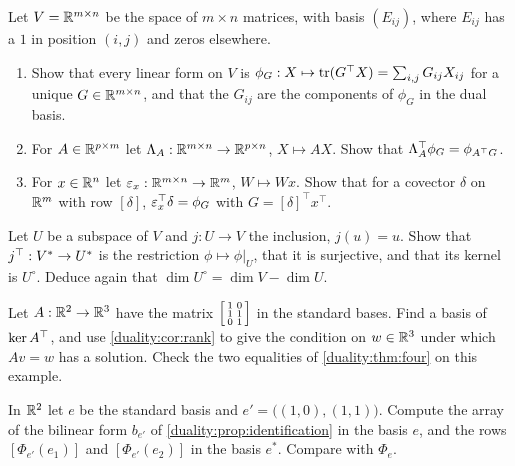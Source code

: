 \begin{notechapter}
\begin{exercise}\label{duality:exr:4}
Let $V = \mathbb{R}^{m\times n}$ be the space of $m\times n$ matrices, with basis
$(E_{ij})$, where $E_{ij}$ has a $1$ in position $(i, j)$ and zeros
elsewhere.
\begin{enumerate}[nosep]
  \item Show that every linear form on $V$ is
        $\phi_G:X\mapsto\operatorname{tr}(G^\top X) = \sum_{i,j}G_{ij}X_{ij}$ for a
        unique $G\in\mathbb{R}^{m\times n}$, and that the $G_{ij}$ are the
        components of $\phi_G$ in the dual basis.
  \item For $A\in\mathbb{R}^{p\times m}$ let $\Lambda_A:\mathbb{R}^{m\times n}\to
        \mathbb{R}^{p\times n}$, $X\mapsto AX$. Show that
        $\Lambda_A^{\top}\phi_G = \phi_{A^\top G}$.
  \item For $x\in\mathbb{R}^n$ let $\varepsilon_x:\mathbb{R}^{m\times n}\to\mathbb{R}^m$,
        $W\mapsto Wx$. Show that for a covector $\delta$ on $\mathbb{R}^m$ with
        row $[\delta]$, $\varepsilon_x^{\top}\delta = \phi_G$ with
        $G = [\delta]^\top x^\top$.
\end{enumerate}
\end{exercise}

\begin{exercise}\label{duality:exr:5}
Let $U$ be a subspace of $V$ and $j:U\to V$ the inclusion, $j(u) = u$.
Show that $j^{\top}:V^*\to U^*$ is the restriction $\phi\mapsto\phi|_U$,
that it is surjective, and that its kernel is $U^\circ$. Deduce again that
$\dim U^\circ = \dim V - \dim U$.
\end{exercise}

\begin{exercise}\label{duality:exr:6}
Let $A:\mathbb{R}^2\to\mathbb{R}^3$ have the matrix
$\begin{bsmallmatrix}1 & 0\\1 & 1\\0 & 1\end{bsmallmatrix}$ in the
standard bases. Find a basis of $\ker A^{\top}$, and use
\cref{duality:cor:rank} to give the condition on $w\in\mathbb{R}^3$ under which
$Av = w$ has a solution. Check the two equalities of
\cref{duality:thm:four} on this example.
\end{exercise}

\begin{exercise}\label{duality:exr:7}
In $\mathbb{R}^2$ let $e$ be the standard basis and $e' = \bigl((1, 0), (1, 1)\bigr)$.
Compute the array of the bilinear form $b_{e'}$ of
\cref{duality:prop:identification} in the basis $e$, and the rows
$[\Phi_{e'}(e_1)]$ and $[\Phi_{e'}(e_2)]$ in the basis $e^*$. Compare
with $\Phi_e$.
\end{exercise}


\end{notechapter}
